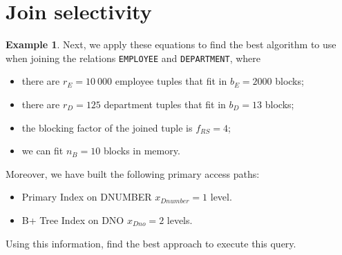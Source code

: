 \documentclass[a4paper, openany]{memoir}
\theoremstyle{definition}
\newtheorem{example}[subsection]{Example}
\begin{document}
\newpage

\section{Join selectivity}
\begin{example}
    Next, we apply these equations to find the best algorithm to use when joining the relations \texttt{EMPLOYEE} and \texttt{DEPARTMENT}, where
    \begin{itemize}
        \item there are $r_E = 10 \ 000$ employee tuples that fit in $b_E = 2000$ blocks;
        \item there are $r_D = 125$ department tuples that fit in $b_D = 13$ blocks;
        \item the blocking factor of the joined tuple is $f_{RS} = 4$;
        \item we can fit $n_B = 10$ blocks in memory.
    \end{itemize}
    Moreover, we have built the following primary access paths:
    \begin{itemize}
        \item Primary Index on DNUMBER $x_{Dnumber} = 1$ level.
        \item B+ Tree Index on DNO $x_{Dno} = 2$ levels.
    \end{itemize}
    Using this information, find the best approach to execute this query.
\end{example}
\end{document}
